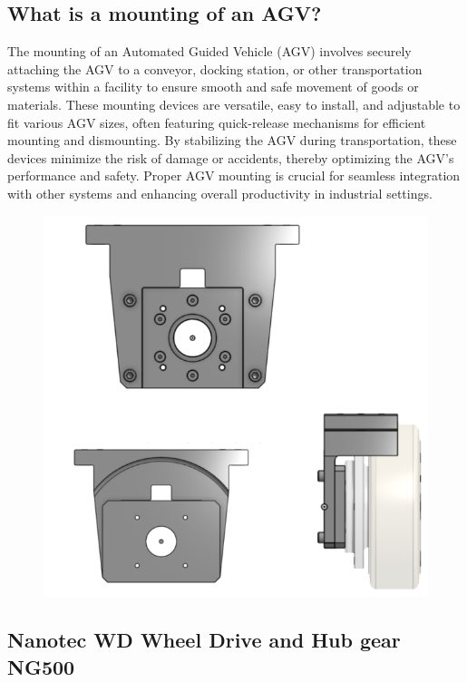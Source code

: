 \documentclass[../../main]{subfiles}
\begin{document}
  \subsection{What is a mounting of an AGV?}
  The mounting of an Automated Guided Vehicle (AGV) involves securely attaching the AGV to a conveyor, docking station, or other transportation systems within a facility to ensure smooth and safe movement of goods or materials. These mounting devices are versatile, easy to install, and adjustable to fit various AGV sizes, often featuring quick-release mechanisms for efficient mounting and dismounting. By stabilizing the AGV during transportation, these devices minimize the risk of damage or accidents, thereby optimizing the AGV's performance and safety. Proper AGV mounting is crucial for seamless integration with other systems and enhancing overall productivity in industrial settings.
\begin{figure}[h!]
\centering
\includegraphics[width=\textwidth]{img/wheel3d.png}
\caption{}
\end{figure}

\subsection{Nanotec WD Wheel Drive and Hub gear NG500}
\end{document}
